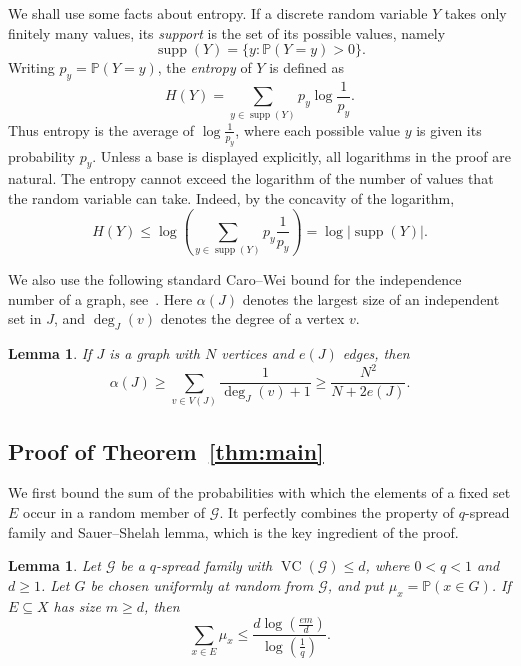 \documentclass[10pt,a4paper]{amsart}
\newtheorem{lemma}[theorem]{Lemma}
\newcommand*{\abs}[1]{\lvert#1\rvert}
\newcommand{\cG}{\mathcal{G}}
\newcommand{\VC}{\operatorname{VC}}
\begin{document}
We shall use some facts about entropy. If a discrete random variable \(Y\) takes only finitely many values, its \emph{support} is the set of its possible values, namely
\[
\operatorname{supp}(Y)=\{y:\mathbb{P}(Y=y)>0\}.
\]
Writing \(p_{y}=\mathbb{P}(Y=y)\), the \emph{entropy} of \(Y\) is defined as
\[
H(Y)=\sum_{y\in\operatorname{supp}(Y)}p_{y}\log\frac{1}{p_{y}}.
\]
Thus entropy is the average of \(\log\frac{1}{p_{y}}\), where each possible value \(y\) is given its probability \(p_{y}\). Unless a base is displayed explicitly, all logarithms in the proof are natural. The entropy cannot exceed the logarithm of the number of values that the random variable can take. Indeed, by the concavity of the logarithm,
\begin{equation}\label{eq:concavity}
H(Y)\le \log\left(\sum_{y\in\operatorname{supp}(Y)}p_{y}\frac{1}{p_{y}}\right)
=\log\abs{\operatorname{supp}(Y)}.
\end{equation}

We also use the following standard Caro--Wei bound for the independence number of a graph, see~\cite{AS16}. Here \(\alpha(J)\) denotes the largest size of an independent set in \(J\), and \(\deg_{J}(v)\) denotes the degree of a vertex \(v\).

\begin{lemma}\label{lem:independence}
If \(J\) is a graph with \(N\) vertices and \(e(J)\) edges, then
\[
\alpha(J)\ge \sum_{v\in V(J)}\frac{1}{\deg_{J}(v)+1}\ge \frac{N^{2}}{N+2e(J)}.
\]
\end{lemma}

\subsection{Proof of Theorem~\ref{thm:main}}

We first bound the sum of the probabilities with which the elements of a fixed set \(E\) occur in a random member of \(\cG\). It perfectly combines the property of \(q\)-spread family and Sauer--Shelah lemma, which is the key ingredient of the proof.

\begin{lemma}\label{lem:local-entropy}
Let \(\cG\) be a \(q\)-spread family with \(\VC(\cG)\le d\), where \(0<q<1\) and \(d\ge 1\). Let \(G\) be chosen uniformly at random from \(\cG\), and put \(\mu_{x}=\mathbb{P}(x\in G)\). If \(E\subseteq X\) has size \(m\ge d\), then
\[
\sum_{x\in E}\mu_{x}\le \frac{d\log\left(\frac{em}{d}\right)}{\log\left(\frac{1}{q}\right)}.
\]
\end{lemma}
\end{document}
